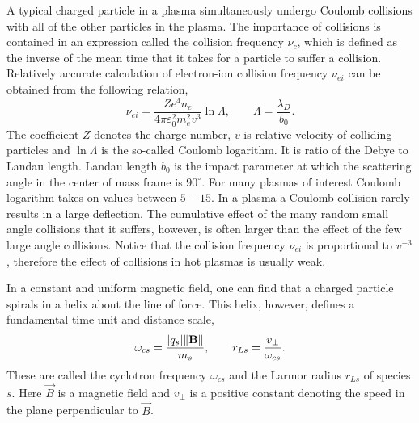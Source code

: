 A typical charged particle in a plasma simultaneously undergo Coulomb collisions with all of the other particles in the plasma. The importance of collisions is contained in an expression called the collision frequency $ \nu_c $, which is defined as the inverse of the mean time that it takes for a particle to suffer a collision. Relatively accurate calculation of electron-ion collision frequency $ \nu_{ei} $ can be obtained from the following relation,
\begin{equation}
\label{2.1.6}
\nu_{ei} = \frac{Z e^4 n_e}{4 \pi \varepsilon_0^2 m_e^2 v^3} \ln{\Lambda}, \qquad \Lambda = \frac{\lambda_D}{b_0}.
\end{equation}
The coefficient $ Z $ denotes the charge number, $ v $ is relative velocity of colliding particles and $ \ln \Lambda $ is the so-called Coulomb logarithm. It is ratio of the Debye to Landau length. Landau length $ b_0 $ is the impact parameter at which the scattering angle in the center of mass frame is $ 90^\circ $. For many plasmas of interest Coulomb logarithm takes on values between $ 5 - 15 $. In a plasma a Coulomb collision rarely results in a large deflection. The cumulative effect of the many random small angle collisions that it suffers, however, is often larger than the effect of the few large angle collisions. Notice that the collision frequency $ \nu_{ei} $ is proportional to $ v^{-3} $, therefore the effect of collisions in hot plasmas is usually weak.

In a constant and uniform magnetic field, one can find that a charged particle spirals in a helix about the line of force. This helix, however, defines a fundamental time unit and distance scale,
\begin{equation}
\label{2.1.7}
\omega_{cs} = \frac{\lvert q_{s}\rvert \lVert\mathbf{B}\rVert}{m_{s}}, \qquad r_{Ls} = \frac{v_\perp}{\omega_{cs}}.
\end{equation}
These are called the cyclotron frequency $ \omega_{cs} $ and the Larmor radius $ r_{Ls} $ of species $ s $. Here $ \vec{B} $ is a magnetic field and $ v_\perp $ is a positive constant denoting the speed in the plane perpendicular to $ \vec{B} $.
